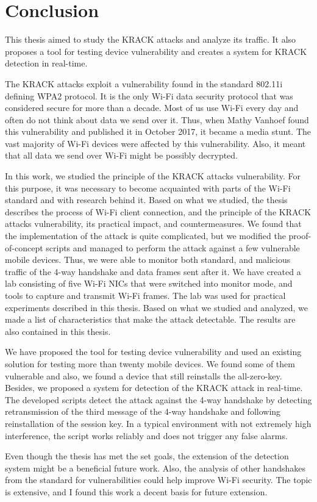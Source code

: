 \chapter{Conclusion}
\label{chap:conclusion}

This thesis aimed to study the KRACK attacks and analyze its traffic. It also proposes a tool for testing device vulnerability and creates a system for KRACK detection in real-time. 

The KRACK attacks exploit a vulnerability found in the standard 802.11i defining WPA2 protocol. It is the only Wi-Fi data security protocol that was considered secure for more than a decade. Most of us use Wi-Fi every day and often do not think about data we send over it. Thus, when Mathy Vanhoef found this vulnerability and published it in October 2017, it became a media stunt. The vast majority of Wi-Fi devices were affected by this vulnerability. Also, it meant that all data we send over Wi-Fi might be possibly decrypted. 

In this work, we studied the principle of the KRACK attacks vulnerability. For this purpose, it was necessary to become acquainted with parts of the Wi-Fi standard and with research behind it. Based on what we studied, the thesis describes the process of Wi-Fi client connection, and the principle of the KRACK attacks vulnerability, its practical impact, and countermeasures. We found that the implementation of the attack is quite complicated, but we modified the proof-of-concept scripts and managed to perform the attack against a few vulnerable mobile devices. Thus, we were able to monitor both standard, and malicious traffic of the 4-way handshake and data frames sent after it. We have created a lab consisting of five Wi-Fi NICs that were switched into monitor mode, and tools to capture and transmit Wi-Fi frames. The lab was used for practical experiments described in this thesis. Based on what we studied and analyzed, we made a list of characteristics that make the attack detectable. The results are also contained in this thesis.

We have proposed the tool for testing device vulnerability and used an existing solution for testing more than twenty mobile devices. We found some of them vulnerable and also, we found a device that still reinstalls the all-zero-key. Besides, we proposed a system for detection of the KRACK attack in real-time. The developed scripts detect the attack against the 4-way handshake by detecting retransmission of the third message of the 4-way handshake and following reinstallation of the session key. In a typical environment with not extremely high interference, the script works reliably and does not trigger any false alarms.

Even though the thesis has met the set goals, the extension of the detection system might be a beneficial future work. Also, the analysis of other handshakes from the standard for vulnerabilities could help improve Wi-Fi security. The topic is extensive, and I found this work a decent basis for future extension.